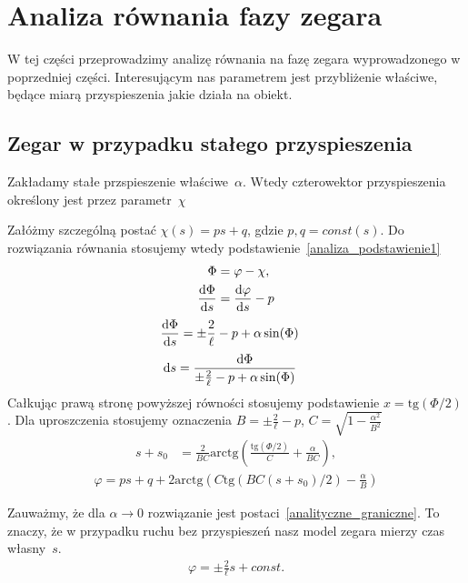\newpage
\section{Analiza równania fazy zegara}
W tej części przeprowadzimy analizę równania na fazę zegara
wyprowadzonego w poprzedniej części.
Interesującym nas parametrem jest przybliżenie właściwe, będące miarą 
przyspieszenia jakie działa na obiekt. 

\subsection{Zegar w przypadku stałego przyspieszenia}
Zakładamy stałe przspieszenie właściwe~$\alpha$. Wtedy czterowektor 
przyspieszenia określony jest przez parametr~$\chi$

Załóżmy szczególną postać $\chi (s) = p s + q$, 
gdzie $p,q = const(s)$. Do rozwiązania równania stosujemy wtedy 
podstawienie~\eqref{analiza_podstawienie1}
\begin{align} \label{analiza_podstawienie1}
\Phi &= \varphi - \chi,\\
\frac{\text{d} \Phi}{\text{d} s} &= \frac{\text{d} \varphi }{\text{d} s} - p
\end{align}
\begin{align*}
\frac{\text{d} \Phi}{\text{d} s} &= \pm \frac{2}{\ell} - p  + 
\alpha \sin (\Phi ) 
\end{align*}
\begin{align*}
\text{d} s & = \frac{\text{d} \Phi}{ \pm \frac{2}{\ell} - p  + 
\alpha \sin (\Phi ) }
\end{align*}
Całkując prawą stronę powyższej równości stosujemy podstawienie
 $ x = \text{tg} (\Phi/2)$. Dla uproszczenia stosujemy oznaczenia
$B = \pm \frac{2}{\ell} - p $,
$C =  \sqrt{ 1 - \frac{\alpha^2}{B^2}}$
\begin{align*}
s +s_0 & = \frac{2}{BC} \text{arctg}  
\left( \frac{ \text{tg} (\Phi/2)}{C} +\frac{\alpha}{BC} \right),
\end{align*}
\begin{align*}
\varphi = ps + q + 
2\text{arctg} \left( 
C \text{tg} \left( BC(s + s_0)/2\right)  - \frac{\alpha}{B}
\right)
\end{align*}

Zauważmy, że dla $\alpha \to 0$ rozwiązanie jest 
postaci~\eqref{analityczne_graniczne}. To znaczy, że w przypadku ruchu
bez przyspieszeń nasz model zegara mierzy czas własny~$s$.
\begin{align}\label{analityczne_graniczne}
\varphi = \pm \frac{2}{\ell} s + const.
\end{align}

